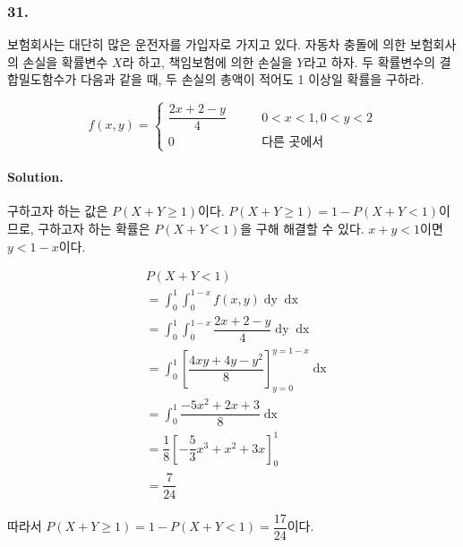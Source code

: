 \subsubsection{31.} 보험회사는 대단히 많은 운전자를 가입자로 가지고 있다. 자동차 충돌에 의한 보험회사의 손실을 확률변수 $X$라 하고, 책임보험에 의한 손실을 $Y$라고 하자. 두 확률변수의 결합밀도함수가 다음과 같을 때, 두 손실의 총액이 적어도 1 이상일 확률을 구하라.

\[f\left(x, y\right) = \left\{
\begin{array}{ll}
	\dfrac{2x+2-y}{4} & \qquad 0<x<1, 0<y<2 \\
	0 & \qquad\textrm{다른 곳에서}
\end{array}
\right. \]

\paragraph{Solution.} 구하고자 하는 값은 $P\left(X+Y\geq 1\right)$이다. $P\left(X+Y\geq 1\right) = 1 - P\left(X+Y<1\right)$이므로, 구하고자 하는 확률은 $P\left(X+Y<1\right)$을 구해 해결할 수 있다. $x+y<1$이면 $y<1-x$이다.

\begin{align*}
	& P\left(X+Y<1\right) \\
	&= \int_0^1 \int_0^{1-x} f\left(x, y\right) \mathop{dy} \mathop{dx} \\
	&= \int_0^1 \int_0^{1-x} \dfrac{2x+2-y}{4} \mathop{dy} \mathop{dx} \\
	&= \int_0^1 \left[ \dfrac{4xy+4y-y^2}{8} \right]_{y=0}^{y=1-x} \mathop{dx} \\
	&= \int_0^1 \dfrac{-5x^2+2x+3}{8} \mathop{dx} \\
	&= \dfrac{1}{8} \left[ -\dfrac{5}{3}x^3+x^2+3x \right]_0^1 \\
	&= \dfrac{7}{24}
\end{align*}

따라서 $P\left(X+Y\geq 1\right) = 1 - P\left(X+Y<1\right) = \dfrac{17}{24}$이다.